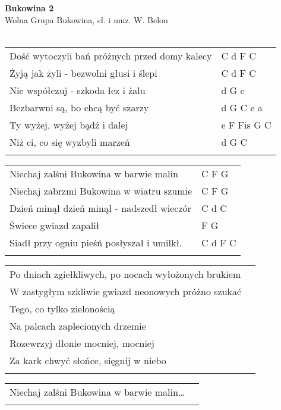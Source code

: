 \documentclass[a5paper]{article}
\begin{document}


\noindent
\fontsize{12pt}{15pt}\selectfont
\textbf{Bukowina 2} \\
\fontsize{8pt}{10pt}\selectfont
Wolna Grupa Bukowina, sł. i muz. W. Belon  \\ \\
\fontsize{10pt}{12pt}\selectfont
{}
\begin{tabular}{@{}p{8.5cm}p{3cm}@{}}
\noindent
Dość wytoczyli bań próżnych przed domy kalecy & C d F C \\
Żyją jak żyli - bezwolni głusi i ślepi & C d F C \\
Nie współczuj - szkoda łez i żalu & d G e \\
Bezbarwni są, bo chcą być szarzy & d G C e a \\
Ty wyżej, wyżej bądź i dalej & e F Fis G C \\
Niż ci, co się wyzbyli marzeń & d G C \\ \\
\end{tabular}

\noindent
\begin{tabular}{@{}p{7.5cm}p{3cm}@{}}
Niechaj zalśni Bukowina w barwie malin & C F G \\
Niechaj zabrzmi Bukowina w wiatru szumie & C F G \\
Dzień minął dzień minął - nadszedł wieczór & C d C \\
Świece gwiazd zapalił & F G \\
Siadł przy ogniu pieśń posłyszał i umilkł. & C d  F C \\ \\
\end{tabular}

\noindent
\begin{tabular}{@{}p{8.5cm}p{3cm}@{}}
Po dniach zgiełkliwych, po nocach wyłożonych brukiem \\
W zastygłym szkliwie gwiazd neonowych próżno szukać \\
Tego, co tylko zielonością \\
Na palcach zaplecionych drzemie \\
Rozewrzyj dłonie mocniej, mocniej \\
Za kark chwyć słońce, sięgnij w niebo \\ \\
\end{tabular}

\noindent
\begin{tabular}{@{}p{8.5cm}p{3cm}@{}}
Niechaj zalśni Bukowina w barwie malin… \\ \\
\end{tabular}
\end{document}
